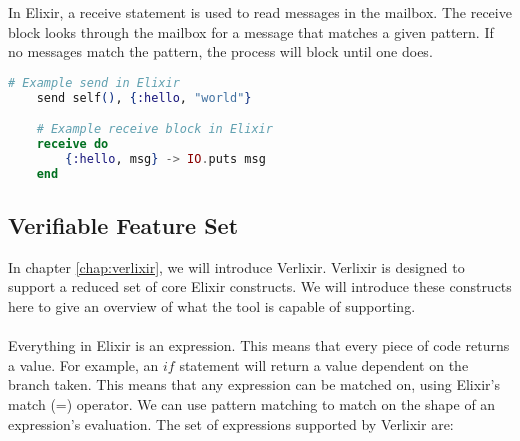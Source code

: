 In Elixir, a receive statement is used to read messages in the mailbox. The receive block looks through the mailbox for a message that matches a given pattern. If no messages match the pattern, the process will block until one does.
\begin{lstlisting}[language=Elixir, xleftmargin=.4\linewidth, caption={An example of spawn/1 and spawn/4 in Elixir for spawning a new lightweight process and a new Elixir node}]
    # Example send in Elixir
    send self(), {:hello, "world"}

    # Example receive block in Elixir
    receive do
        {:hello, msg} -> IO.puts msg
    end
\end{lstlisting}
\subsection{Verifiable Feature Set} \label{sec:verifiable_feature_set}
In chapter \ref{chap:verlixir}, we will introduce Verlixir. Verlixir is designed to support a reduced set of core Elixir constructs. We will introduce these constructs here to give an overview of what the tool is capable of supporting.
\\ \\
Everything in Elixir is an expression. This means that every piece of code returns a value. For example, an $if$ statement will return a value dependent on the branch taken. This means that any expression can be matched on, using Elixir's match (=) operator. We can use pattern matching to match on the shape of an expression's evaluation. The set of expressions supported by Verlixir are:
